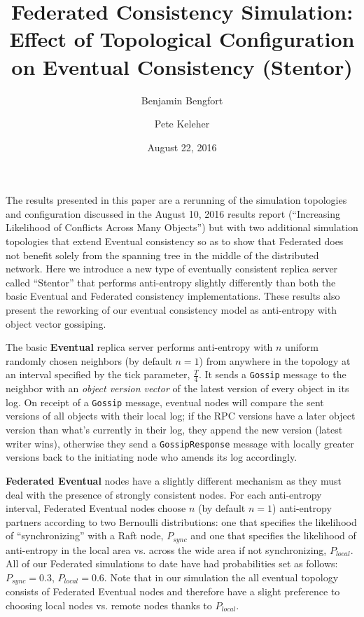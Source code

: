 \documentclass[11pt,letterpaper]{article}
\title{Federated Consistency Simulation: \\
Effect of Topological Configuration on Eventual Consistency (Stentor)}
\date{August 22, 2016}
\author[ ]{Benjamin Bengfort}
\author[ ]{Pete Keleher}
\affil[ ]{Department of Computer Science}
\affil[ ]{University of Maryland}
\affil[ ]{\textit{\{bengfort,keleher\}@cs.umd.edu}}
\begin{document}
\maketitle

The results presented in this paper are a rerunning of the simulation topologies and configuration discussed in the August 10, 2016 results report (``Increasing Likelihood of Conflicts Across Many Objects'') but with two additional simulation topologies that extend Eventual consistency so as to show that Federated does not benefit solely from the spanning tree in the middle of the distributed network. Here we introduce a new type of eventually consistent replica server called ``Stentor'' that performs anti-entropy slightly differently than both the basic Eventual and Federated consistency implementations. These results also present the reworking of our eventual consistency model as anti-entropy with object vector gossiping.

The basic \textbf{Eventual} replica server performs anti-entropy with $n$ uniform randomly chosen neighbors (by default $n=1$) from anywhere in the topology at an interval specified by the tick parameter, $\frac {T} {4}$. It sends a \texttt{Gossip} message to the neighbor with an \textit{object version vector} of the latest version of every object in its log. On receipt of a \texttt{Gossip} message, eventual nodes will compare the sent versions of all objects with their local log; if the RPC versions have a later object version than what's currently in their log, they append the new version (latest writer wins), otherwise they send a \texttt{GossipResponse} message with locally greater versions back to the initiating node who amends its log accordingly.

\textbf{Federated Eventual} nodes have a slightly different mechanism as they must deal with the presence of strongly consistent nodes. For each anti-entropy interval, Federated Eventual nodes choose $n$ (by default $n=1$) anti-entropy partners according to two Bernoulli distributions: one that specifies the likelihood of ``synchronizing'' with a Raft node, $P_{sync}$ and one that specifies the likelihood of anti-entropy in the local area vs. across the wide area if not synchronizing, $P_{local}$. All of our Federated simulations to date have had probabilities set as follows: $P_{sync} = 0.3$, $P_{local}=0.6$. Note that in our simulation the all eventual topology consists of Federated Eventual nodes and therefore have a slight preference to choosing local nodes vs. remote nodes thanks to $P_{local}$.
\end{document}
